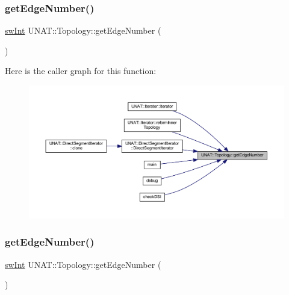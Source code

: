 \mbox{\label{classUNAT_1_1Topology_ace06d8f272b20bdf46d3327f9e0fddf2}} 
\subsubsection{\texorpdfstring{getEdgeNumber()}{getEdgeNumber()}\hspace{0.1cm}{\footnotesize\ttfamily [1/3]}}
{\footnotesize\ttfamily \mbox{\hyperlink{include_2swMacro_8h_a113cf5f6b5377cdf3fac6aa4e443e9aa}{sw\+Int}} U\+N\+A\+T\+::\+Topology\+::get\+Edge\+Number (\begin{DoxyParamCaption}{ }\end{DoxyParamCaption})}

Here is the caller graph for this function\+:
\nopagebreak
\begin{figure}[H]
\begin{center}
\leavevmode
\includegraphics[width=350pt]{classUNAT_1_1Topology_ace06d8f272b20bdf46d3327f9e0fddf2_icgraph}
\end{center}
\end{figure}
\mbox{\label{classUNAT_1_1Topology_ace06d8f272b20bdf46d3327f9e0fddf2}} 
\subsubsection{\texorpdfstring{getEdgeNumber()}{getEdgeNumber()}\hspace{0.1cm}{\footnotesize\ttfamily [2/3]}}
{\footnotesize\ttfamily \mbox{\hyperlink{include_2swMacro_8h_a113cf5f6b5377cdf3fac6aa4e443e9aa}{sw\+Int}} U\+N\+A\+T\+::\+Topology\+::get\+Edge\+Number (\begin{DoxyParamCaption}{ }\end{DoxyParamCaption})}

